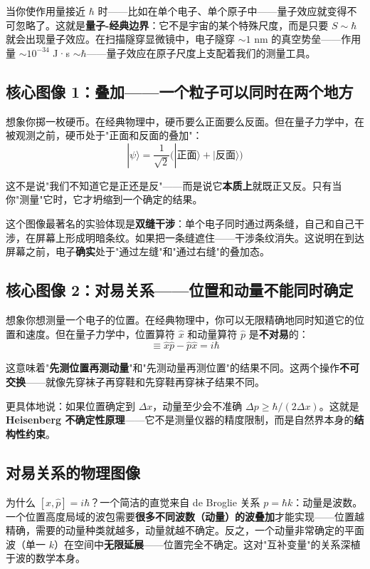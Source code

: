 当你使作用量接近 $\hbar$ 时——比如在单个电子、单个原子中——量子效应就变得不可忽略了。这就是\textbf{量子-经典边界}：它不是宇宙的某个特殊尺度，而是只要 $S \sim \hbar$ 就会出现量子效应。在扫描隧穿显微镜中，电子隧穿 $\sim 1$ nm 的真空势垒——作用量 $\sim 10^{-34}$ J·s $\sim \hbar$——量子效应在原子尺度上支配着我们的测量工具。

\subsection{核心图像 1：叠加——一个粒子可以同时在两个地方}

想象你掷一枚硬币。在经典物理中，硬币要么正面要么反面。但在量子力学中，在被观测之前，硬币处于"正面和反面的叠加"：
\[
|\psi\rangle = \frac{1}{\sqrt{2}}\big(|\text{正面}\rangle + |\text{反面}\rangle\big)
\]

这不是说"我们不知道它是正还是反"——而是说它\textbf{本质上}就既正又反。只有当你"测量"它时，它才坍缩到一个确定的结果。

这个图像最著名的实验体现是\textbf{双缝干涉}：单个电子同时通过两条缝，自己和自己干涉，在屏幕上形成明暗条纹。如果把一条缝遮住——干涉条纹消失。这说明在到达屏幕之前，电子\textbf{确实}处于"通过左缝"和"通过右缝"的叠加态。

\subsection{核心图像 2：对易关系——位置和动量不能同时确定}

想象你想测量一个电子的位置。在经典物理中，你可以无限精确地同时知道它的位置和速度。但在量子力学中，位置算符 $\hat{x}$ 和动量算符 $\hat{p}$ 是\textbf{不对易}的：
\begin{equation}
[\hat{x}, \hat{p}] \equiv \hat{x}\hat{p} - \hat{p}\hat{x} = i\hbar
\end{equation}

这意味着"\textbf{先测位置再测动量}"和"先测动量再测位置"的结果不同。这两个操作\textbf{不可交换}——就像先穿袜子再穿鞋和先穿鞋再穿袜子结果不同。

更具体地说：如果位置确定到 $\Delta x$，动量至少会不准确 $\Delta p \ge \hbar/(2\Delta x)$。这就是\textbf{Heisenberg 不确定性原理}——它不是测量仪器的精度限制，而是自然界本身的\textbf{结构性约束}。

\subsection{对易关系的物理图像}

为什么 $[\hat{x}, \hat{p}] = i\hbar$？一个简洁的直觉来自 de Broglie 关系 $p = \hbar k$：动量是波数。一个位置高度局域的波包需要\textbf{很多不同波数（动量）的波叠加}才能实现——位置越精确，需要的动量种类就越多，动量就越不确定。反之，一个动量非常确定的平面波（单一 $k$）在空间中\textbf{无限延展}——位置完全不确定。这对"互补变量"的关系深植于波的数学本身。

